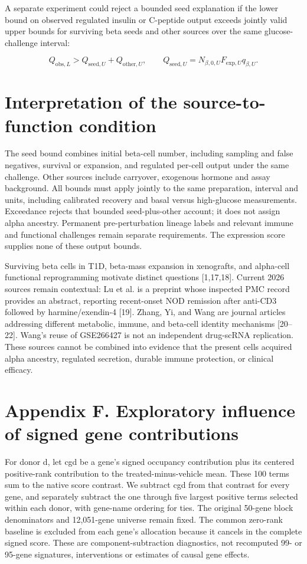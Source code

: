 \documentclass[11pt,letterpaper]{article}
\begin{document}
A separate experiment could reject a bounded seed explanation if the lower bound on observed regulated insulin or C-peptide output exceeds jointly valid upper bounds for surviving beta seeds and other sources over the same glucose-challenge interval:

\[Q_{\mathrm{obs},L}>Q_{\mathrm{seed},U}+Q_{\mathrm{other},U},\qquad Q_{\mathrm{seed},U}=N_{\beta,0,U}F_{\mathrm{exp},U}q_{\beta,U}.\]
\section*{Interpretation of the source-to-function condition}
The seed bound combines initial beta-cell number, including sampling and false negatives, survival or expansion, and regulated per-cell output under the same challenge. Other sources include carryover, exogenous hormone and assay background. All bounds must apply jointly to the same preparation, interval and units, including calibrated recovery and basal versus high-glucose measurements. Exceedance rejects that bounded seed-plus-other account; it does not assign alpha ancestry. Permanent pre-perturbation lineage labels and relevant immune and functional challenges remain separate requirements. The expression score supplies none of these output bounds.

Surviving beta cells in T1D, beta-mass expansion in xenografts, and alpha-cell functional reprogramming motivate distinct questions [1,17,18]. Current 2026 sources remain contextual: Lu et al. is a preprint whose inspected PMC record provides an abstract, reporting recent-onset NOD remission after anti-CD3 followed by harmine/exendin-4 [19]. Zhang, Yi, and Wang are journal articles addressing different metabolic, immune, and beta-cell identity mechanisms [20–22]. Wang's reuse of GSE266427 is not an independent drug-scRNA replication. These sources cannot be combined into evidence that the present cells acquired alpha ancestry, regulated secretion, durable immune protection, or clinical efficacy.

\section*{Appendix F. Exploratory influence of signed gene contributions}
For donor d, let cgd be a gene’s signed occupancy contribution plus its centered positive-rank contribution to the treated-minus-vehicle mean. These 100 terms sum to the native score contrast. We subtract cgd from that contrast for every gene, and separately subtract the one through five largest positive terms selected within each donor, with gene-name ordering for ties. The original 50-gene block denominators and 12,051-gene universe remain fixed. The common zero-rank baseline is excluded from each gene’s allocation because it cancels in the complete signed score. These are component-subtraction diagnostics, not recomputed 99- or 95-gene signatures, interventions or estimates of causal gene effects.
\end{document}
